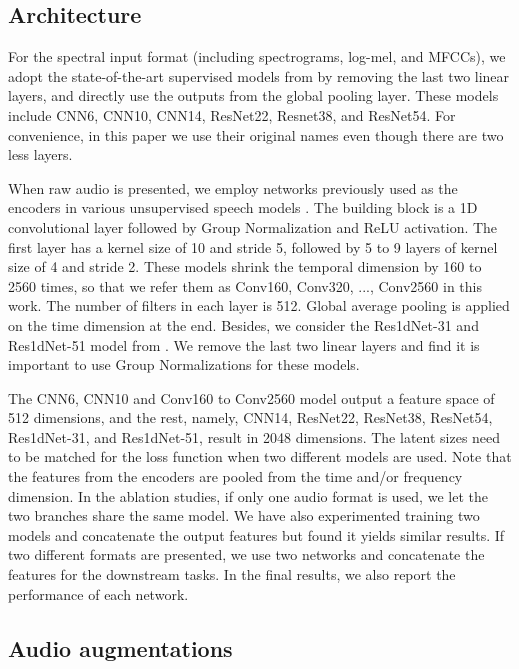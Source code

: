 \documentclass{article}
\begin{document}
\subsection{Architecture}

For the spectral input format (including spectrograms, log-mel, and MFCCs), we adopt the state-of-the-art supervised models from \cite{kong2020panns} by removing the last two linear layers, and directly use the outputs from the global pooling layer. These models include CNN6, CNN10, CNN14, ResNet22, Resnet38, and ResNet54. For convenience, in this paper we use their original names even though there are two less layers.

When raw audio is presented, we employ networks previously used as the encoders in various unsupervised speech models \cite{schneider2019wav2vec, kawakami2020learning, baevski2020wav2vec}. The building block is a 1D convolutional layer followed by Group Normalization and ReLU activation. The first layer has a kernel size of 10 and stride 5, followed by 5 to 9 layers of kernel size of 4 and stride 2. These models shrink the temporal dimension by 160 to 2560 times, so that we refer them as Conv160, Conv320, ..., Conv2560 in this work. The number of filters in each layer is 512. Global average pooling is applied on the time dimension at the end. Besides, we consider the Res1dNet-31 and Res1dNet-51 model from \cite{kong2020panns}. We remove the last two linear layers and find it is important to use Group Normalizations for these models.

The CNN6, CNN10 and Conv160 to Conv2560 model output a feature space of 512 dimensions, and the rest, namely, CNN14, ResNet22, ResNet38, ResNet54, Res1dNet-31, and Res1dNet-51, result in 2048 dimensions. The latent sizes need to be matched for the loss function when two different models are used. Note that the features from the encoders are pooled from the time and/or frequency dimension. In the ablation studies, if only one audio format is used, we let the two branches share the same model. We have also experimented training two models and concatenate the output features but found it yields similar results. If two different formats are presented, we use two networks and concatenate the features for the downstream tasks. In the final results, we also report the performance of each network.


\subsection{Audio augmentations}
\end{document}
